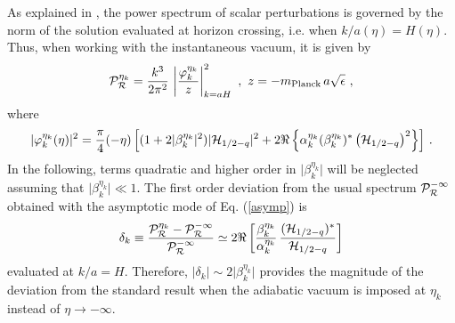 \documentclass[a4paper,aps,prd,preprint,groupedaddress,nofootinbib]{revtex4}
\begin{document}
As explained in \cite{MFB92}, 
the power spectrum of scalar perturbations is governed by the 
norm of the solution evaluated at horizon crossing, i.e. 
when $k/a(\eta) = H(\eta)$. Thus, when working with
the instantaneous vacuum, it is given by
\begin{equation}
{\cal P}_{\cal R}^{\eta_k} = \frac{k^3}{2
\pi^2}\,\left\vert\frac{\varphi_k^{\eta_k}}{z}\right\vert_{k = a H}^2
\,\,,\,\,  z = - m_{\rm Planck} \, a \sqrt{\epsilon}\,\,,
\end{equation}
where
\begin{equation}
\vert\varphi_k^{\eta_k}(\eta)\vert^2 = \frac{\pi}{4}(-\eta) \left[(1 + 2
 \vert\beta_k^{\eta_k}\vert^2) \vert{\cal H}_{1/2 - q}
\vert^2 + 2 \Re\left\{
\alpha_k^{\eta_k}(\beta_k^{\eta_k})^\ast 
\left({\cal H}_{1/2 -q}
\right)^2 \right\}\right] \,.
\end{equation}
In the following, terms quadratic and higher order in
$\vert\beta_k^{\eta_k}\vert$ will be neglected assuming that
$\vert\beta_k^{\eta_k}\vert \ll 1$. 
The first order deviation from the usual 
spectrum ${\cal P}_{\cal R}^{-\infty}$
obtained with the asymptotic mode of Eq. (\ref{asymp}) is
\begin{equation}
\label{delta}
\delta_k \equiv  \frac{ {\cal P}^{\eta_k}_{\cal R}-{\cal P}^{-\infty}_{\cal R} }
{{\cal P}_{\cal R}^{-\infty}}
\simeq 2 \Re\left[ \frac{\beta_k^{\eta_k}}{\alpha_k^{\eta_k}} \,
\frac{({\cal H}_{1/2 - q})^\ast}
{{\cal H}_{1/2 - q}}\right]
\end{equation}
evaluated at $k/a = H$. Therefore, 
$\vert\delta_k\vert \sim 2 \vert\beta_k^{\eta_k}\vert$
provides the magnitude of the deviation from the standard result when
the adiabatic vacuum is imposed at $\eta_k$ instead of $\eta \to -\infty$.
\end{document}
